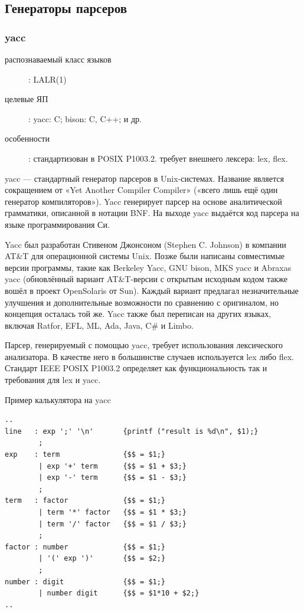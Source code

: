 \documentclass[a4paper,12pt]{article}
\begin{document}
\subsection{Генераторы парсеров}

\subsubsection*{yacc}
\begin{description}
  \item[распознаваемый класс языков]: LALR(1)
  \item[целевые ЯП]: yacc: C; bison: C, C++; и др.
  \item[особенности]: стандартизован в POSIX P1003.2. требует внешнего лексера: lex, flex.
\end{description}
yacc — стандартный генератор парсеров в Unix-системах. Название является
сокращением от «Yet Another Compiler Compiler» («всего лишь ещё один генератор
компиляторов»). Yacc генерирует парсер на основе аналитической грамматики,
описанной в нотации BNF. На выходе yacc выдаётся код парсера на языке
программирования Си.

Yacc был разработан Стивеном Джонсоном (Stephen C. Johnson) в компании AT\&T
для операционной системы Unix. Позже были написаны совместимые версии
программы, такие как Berkeley Yacc, GNU bison, MKS yacc и Abraxas yacc
(обновлённый вариант AT\&T-версии с открытым исходным кодом также вошёл в
проект OpenSolaris от Sun). Каждый вариант предлагал незначительные улучшения и
дополнительные возможности по сравнению с оригиналом, но концепция осталась той
же. Yacc также был переписан на других языках, включая Ratfor, EFL, ML, Ada,
Java, C\# и Limbo.

Парсер, генерируемый с помощью yacc, требует использования лексического
анализатора. В качестве него в большинстве случаев используется lex либо
flex. Стандарт IEEE POSIX P1003.2 определяет как функциональность так и
требования для lex и yacc.

\begin{example}
Пример калькулятора на yacc
\end{example}
\begin{verbatim}
..
line   : exp ';' '\n'       {printf ("result is %d\n", $1);}
        ;
exp    : term               {$$ = $1;}
        | exp '+' term      {$$ = $1 + $3;}
        | exp '-' term      {$$ = $1 - $3;}
        ;
term   : factor             {$$ = $1;}
        | term '*' factor   {$$ = $1 * $3;}
        | term '/' factor   {$$ = $1 / $3;}
        ;
factor : number             {$$ = $1;}
        | '(' exp ')'       {$$ = $2;}
        ;
number : digit              {$$ = $1;}
        | number digit      {$$ = $1*10 + $2;}
..
\end{verbatim}
\end{document}
